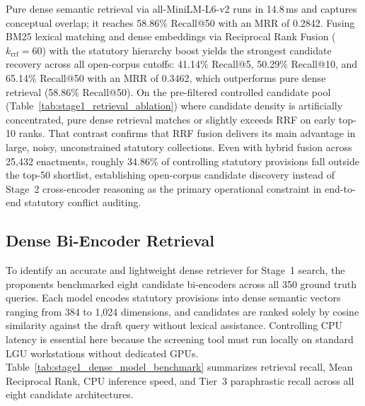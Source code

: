 Pure dense semantic retrieval via all-MiniLM-L6-v2 runs in 14.8\,ms and captures conceptual overlap; it reaches 58.86\% Recall@50 with an MRR of 0.2842. Fusing BM25 lexical matching and dense embeddings via Reciprocal Rank Fusion ($k_{\text{rrf}}=60$) with the statutory hierarchy boost yields the strongest candidate recovery across all open-corpus cutoffs: 41.14\% Recall@5, 50.29\% Recall@10, and 65.14\% Recall@50 with an MRR of 0.3462, which outperforms pure dense retrieval (58.86\% Recall@50). On the pre-filtered controlled candidate pool (Table~\ref{tab:stage1_retrieval_ablation}) where candidate density is artificially concentrated, pure dense retrieval matches or slightly exceeds RRF on early top-10 ranks. That contrast confirms that RRF fusion delivers its main advantage in large, noisy, unconstrained statutory collections. Even with hybrid fusion across 25,432 enactments, roughly 34.86\% of controlling statutory provisions fall outside the top-50 shortlist, establishing open-corpus candidate discovery instead of Stage~2 cross-encoder reasoning as the primary operational constraint in end-to-end statutory conflict auditing.


\subsection{Dense Bi-Encoder Retrieval}
\label{sec:candidate_dense_biencoder_benchmark}
To identify an accurate and lightweight dense retriever for Stage~1 search, the proponents benchmarked eight candidate bi-encoders across all 350 ground truth queries. Each model encodes statutory provisions into dense semantic vectors ranging from 384 to 1,024 dimensions, and candidates are ranked solely by cosine similarity against the draft query without lexical assistance. Controlling CPU latency is essential here because the screening tool must run locally on standard LGU workstations without dedicated GPUs. Table~\ref{tab:stage1_dense_model_benchmark} summarizes retrieval recall, Mean Reciprocal Rank, CPU inference speed, and Tier~3 paraphrastic recall across all eight candidate architectures.

